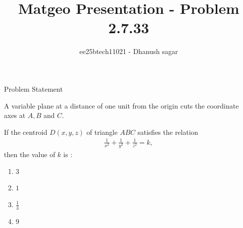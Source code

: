 \documentclass{beamer}
\title{Matgeo Presentation - Problem 2.7.33}
\author{ee25btech11021 - Dhanush sagar}
\numberwithin{equation}{section}
\theoremstyle{remark}
\begin{document}
	

		




\begin{frame}
  \titlepage
\end{frame}

\begin{frame}{Problem Statement}

 A variable plane at a distance of one unit from the origin cuts the coordinate axes at $A, B$ and $C$.  


If the centroid $D(x,y,z)$ of triangle $ABC$ satisfies the relation  
\begin{align*}
\frac{1}{x^{2}} + \frac{1}{y^{2}} + \frac{1}{z^{2}} = k,
\end{align*}
then the value of $k$ is :  

\begin{multicols}{2}
\begin{enumerate}
   \item $3$
    \item $1$
    \item $\tfrac{1}{3}$
    \item $9$
\end{enumerate}
\end{multicols}

\end{frame}
\end{document}
